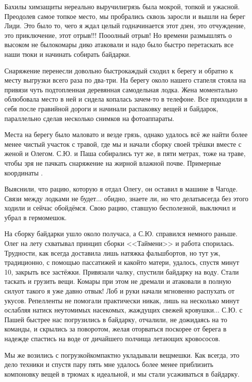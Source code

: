 Бахилы химзащиты нереально выручили\mdash грязь была мокрой, топкой и ужасной. Преодолев самое топкое место, мы пробрались сквозь заросли и вышли на берег Лиди. Это было то, чего я ждал целый год\mdash начинается этот дзен, это отчуждение, это приключение, этот отрыв!!! По\sdash о\sdash олный отрыв! Но времени размышлять о высоком не было\mdash комары дико атаковали и надо было быстро перетаскать все наши тюки и начинать собирать байдарки. 

Снаряжение перенесли довольно быстро\mdash каждый сходил к берегу и обратно к месту выгрузки всего раза по два-три. На берегу около нашего стапеля стояла на привязи чуть подтопленная деревянная самодельная лодка. Жена моментально облюбовала место в ней и сидела копалась зачем-то в телефоне. Все приходили в себя после гравийной дороги и начинали распаковку вещей и байдарок, параллельно сделав несколько снимков на фотоаппараты. 

Места на берегу было маловато и везде грязь, однако удалось всё же найти более менее чистый участок с травой, где мы и начали сборку своей трёшки вместе с женой и Олегом. С.Ю. и Паша собирались тут же, в пяти метрах, тоже на траве, чтобы зря не пачкать снаряжение на жирной влажной почве. Примерные координаты \CoordsLidSeventeenStapel.

Выяснили, что рацию, которую я отдал Олегу, он оставил в машине в Чагоде. Связи между лодками не будет$\ldots$ обидно, знаете ли, но что делать\mdash всегда без этого ходили и сейчас обойдёмся. Свою рацию, ставшую бесполезной, выключил и убрал в гермомешок.

На сборку байдарки ушло около получаса, а С.Ю. справился немного раньше. Олег на лету схватывал принцип сборки <<Таймени>> и работа спорилась. Трудности, как всегда доставила лишь натяжка фальшбортов, но тут уж, традиционно, с помощью пассатижей и какой\sdash то матери, удалось, спустя минут 10, закрыть все застёжки. Привязали чалку, спустили байдарку на воду. Стали таскать и грузить вещи. Комары при этом не дремали и атаковали в полную силу\mdash от такого я уже давно отвык! Лоб и руки начали мгновенно распухать от укусов. Репелленты не помогали практически никак, лишь на несколько минут ослабляя натиск неутомимых насекомых, жаждущих свежей кровушки$\ldots$ С.Ю. с Пашей быстрее нас погрузились в байдарку, отчалили, не дожидаясь на то команды, и скрылись за поворотом, желая оторваться поскорее от берега в надежде спастись на воде от дичайшего полчища летающих кровососов.

Мы же возились с погрузкой\mdash компактно укладывали вещмешки. Как всегда, это дело техники и спустя пару пять мне удалось более менее приблизить компоновку вещей в трюмах к идеальной, и мы стали усаживаться в байдарку. 


